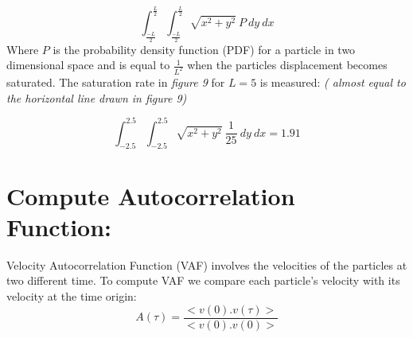 \documentclass[a4paper,11pt]{article}
\begin{document}
\begin{itemize}
\begin{equation*}
\int_{\frac{-L}{2}}^{\frac{L}{2}} \int_{\frac{-L}{2}}^{\frac{L}{2}} \sqrt{x^2 + y^2}\ P \ dy\ dx
\end{equation*}
Where \(P\) is the probability density function (PDF) for a particle in two dimensional space and is equal to \(\frac{1}{L^2}\) when the particles displacement becomes saturated. The saturation rate in \emph{figure 9}  for \(L = 5\) is measured: \emph{( almost equal to the horizontal line drawn in figure 9)}

\begin{equation*}
\int_{-2.5}^{2.5} \int_{-2.5}^{2.5} \sqrt{x^2 + y^2}\ \frac{1}{25} \ dy\ dx = 1.91 
\end{equation*} 

\end{itemize}
\section*{Compute Autocorrelation Function:}
Velocity Autocorrelation Function (VAF) involves the velocities of the particles at two different time. To compute VAF we compare each particle's velocity with its velocity at the time origin:
\begin{equation*}
  A(\tau) = \frac{<v(0).v(\tau)>}{<v(0).v(0)>}
\end{equation*}
\end{document}
